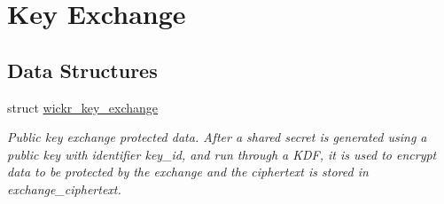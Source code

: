 \hypertarget{group__wickr__key__exchange}{}\section{Key Exchange}
\label{group__wickr__key__exchange}
\subsection*{Data Structures}
\begin{DoxyCompactItemize}
\item 
struct \mbox{\hyperlink{structwickr__key__exchange}{wickr\+\_\+key\+\_\+exchange}}
\begin{DoxyCompactList}\small\item\em Public key exchange protected data. After a shared secret is generated using a public key with identifier \textquotesingle{}key\+\_\+id\textquotesingle{}, and run through a K\+DF, it is used to encrypt data to be protected by the exchange and the ciphertext is stored in \textquotesingle{}exchange\+\_\+ciphertext\textquotesingle{}. \end{DoxyCompactList}\end{DoxyCompactItemize}
